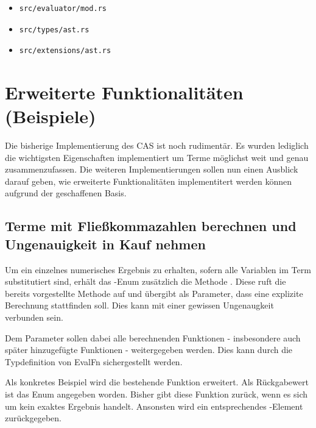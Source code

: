 \documentclass[11pt,a4paper, ngerman]{article}
\begin{document}
\begin{itemize}
    \item \begin{verbatim}src/evaluator/mod.rs\end{verbatim}
    \item \begin{verbatim}src/types/ast.rs\end{verbatim}
    \item \begin{verbatim}src/extensions/ast.rs\end{verbatim}
\end{itemize}

\newpage

\section{Erweiterte Funktionalitäten (Beispiele)}
Die bisherige Implementierung des CAS ist noch rudimentär. Es wurden lediglich die wichtigsten Eigenschaften implementiert um Terme möglichst weit und genau zusammenzufassen.
Die weiteren Implementierungen sollen nun einen Ausblick darauf geben, wie erweiterte Funktionalitäten implementitert werden können aufgrund der geschaffenen Basis. 

\label{sec:ungenauigkeitenKapitel}
\subsection{Terme mit Fließkommazahlen berechnen und Ungenauigkeit in Kauf nehmen} Um ein einzelnes numerisches Ergebnis zu erhalten, sofern alle Variablen im Term substitutiert sind, erhält das -Enum zusätzlich die Methode . Diese ruft die bereits vorgestellte Methode  auf und übergibt als Parameter, dass eine explizite Berechnung stattfinden soll. Dies kann mit einer gewissen Ungenaugkeit verbunden sein.

Dem Parameter  sollen dabei alle berechnenden Funktionen - insbesondere auch später hinzugefügte Funktionen - weitergegeben werden. Dies kann durch die Typdefinition von EvalFn sichergestellt werden.

Als konkretes Beispiel wird die bestehende Funktion  erweitert. Als Rückgabewert ist das Enum  angegeben worden. Bisher gibt diese Funktion  zurück, wenn es sich um kein exaktes Ergebnis handelt. Ansonsten wird ein entsprechendes -Element zurückgegeben.
\end{document}
